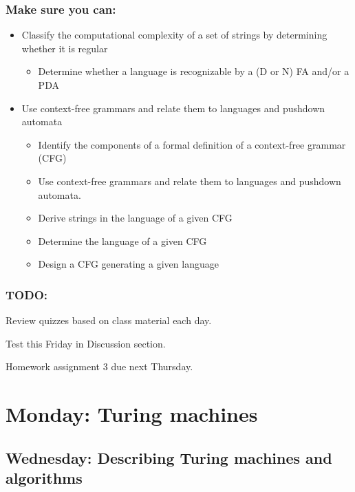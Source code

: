 \subsubsection*{Make sure you can:}
\begin{itemize}
\item Classify the computational complexity of a set of strings by determining whether it is regular
    \begin{itemize}
        \item Determine whether a language is recognizable by a (D or N) FA and/or a PDA
    \end{itemize}
\item Use context-free grammars and relate them to languages and pushdown automata
    \begin{itemize}
        \item Identify the components of a formal definition of a context-free grammar (CFG)
        \item Use context-free grammars and relate them to languages and pushdown automata.
        \item Derive strings in the language of a given CFG
        \item Determine the language of a given CFG
        \item Design a CFG generating a given language
    \end{itemize}
\end{itemize}

\subsubsection*{TODO:}
\begin{list}
   {\itemsep2pt}
   \item Review quizzes based on class material each day.
   \item Test this Friday in Discussion section.
   \item Homework assignment 3 due next Thursday.
\end{list}


\newpage

\section*{Monday: Turing machines}


    
\newpage
\subsection*{Wednesday: Describing Turing machines and algorithms}

